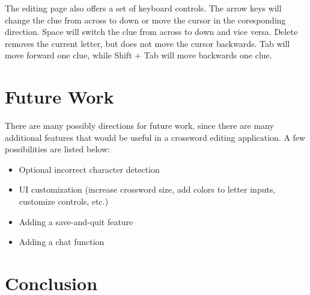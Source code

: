 \documentclass{article}
\begin{document}
The editing page also offers a set of keyboard controls. The arrow keys will change the clue from across to down or move the cursor in the coresponding direction. Space will
switch the clue from across to down and vice versa. Delete removes the current letter, but does not move the cursor backwards. Tab will move forward one clue,
while Shift + Tab will move backwards one clue.

\section{Future Work}
There are many possibly directions for future work, since there 
are many additional features that would be useful in a crossword editing application. 
A few possibilities are listed below:
\begin{itemize}
	\item Optional incorrect character detection
  	\item UI customization (increase crossword size, add colors to letter inputs, customize controls, etc.)
	\item Adding a save-and-quit feature
	\item Adding a chat function
\end{itemize}

\section{Conclusion}

\newpage


\end{document}

